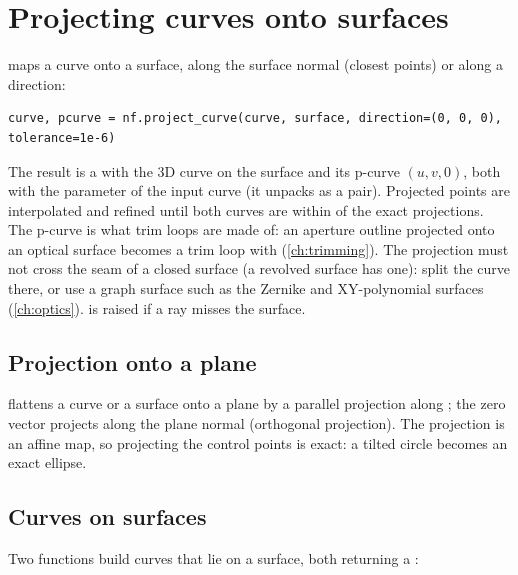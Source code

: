 \section{Projecting curves onto surfaces}\label{sec:project}

 maps a curve onto a surface, along the surface normal (closest points)
or along a direction:

\begin{lstlisting}
curve, pcurve = nf.project_curve(curve, surface, direction=(0, 0, 0), tolerance=1e-6)
\end{lstlisting}

The result is a  with the 3D curve on the surface and its p-curve
$(u,v,0)$, both with the parameter of the input curve (it unpacks as a pair). Projected points
are interpolated and refined until both curves are within  of the exact
projections. The p-curve is what trim loops are made of: an aperture outline projected onto an
optical surface becomes a trim loop with  (\cref{ch:trimming}). The
projection must not cross the seam of a closed surface (a revolved surface has one): split the
curve there, or use a graph surface such as the Zernike and XY-polynomial surfaces
(\cref{ch:optics}).  is raised if a ray misses the surface.

\subsection{Projection onto a plane}

 flattens a curve
or a surface onto a plane by a parallel projection along ; the zero vector
projects along the plane normal (orthogonal projection). The projection is an affine map, so
projecting the control points is exact: a tilted circle becomes an exact ellipse.

\subsection{Curves on surfaces}\label{sec:curves-on-surfaces}

Two functions build curves that lie on a surface, both returning a :

